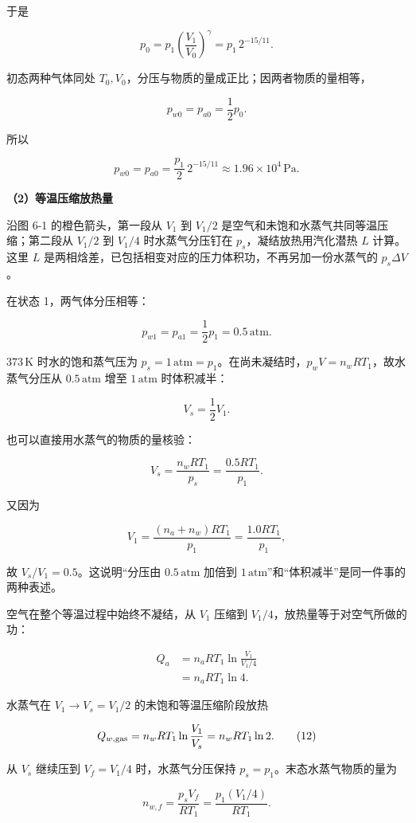 \documentclass[12pt,a4paper,UTF8]{ctexart}
\begin{document}
于是

\[p_0=p_1\left(\frac{V_1}{V_0}\right)^\gamma
=p_1\,2^{-15/11}. \tag{7}\]

初态两种气体同处 \(T_0,V_0\)，分压与物质的量成正比；因两者物质的量相等，

\[p_{w0}=p_{a0}=\frac12p_0.\]

所以

\[\boxed{
p_{w0}=p_{a0}
=\frac{p_1}{2}\,2^{-15/11}
\approx1.96\times10^4\,\mathrm{Pa}
}. \tag{8}\]

\textbf{（2）等温压缩放热量}

沿图 6-1 的橙色箭头，第一段从 \(V_1\) 到 \(V_1/2\)
是空气和未饱和水蒸气共同等温压缩；第二段从 \(V_1/2\) 到 \(V_1/4\)
时水蒸气分压钉在 \(p_s\)，凝结放热用汽化潜热 \(L\) 计算。这里 \(L\)
是两相焓差，已包括相变对应的压力体积功，不再另加一份水蒸气的
\(p_s\Delta V\)。

在状态 1，两气体分压相等：

\[p_{w1}=p_{a1}=\frac12p_1=0.5\,\mathrm{atm}. \tag{9}\]

\(373\,\mathrm K\) 时水的饱和蒸气压为
\(p_s=1\,\mathrm{atm}=p_1\)。在尚未凝结时，\(p_wV=n_wRT_1\)，故水蒸气分压从
\(0.5\,\mathrm{atm}\) 增至 \(1\,\mathrm{atm}\) 时体积减半：

\[V_s=\frac12V_1. \tag{10}\]

也可以直接用水蒸气的物质的量核验：

\[V_s=\frac{n_wRT_1}{p_s}
=\frac{0.5RT_1}{p_1}.\]

又因为

\[V_1=\frac{(n_a+n_w)RT_1}{p_1}
=\frac{1.0RT_1}{p_1},\]

故 \(V_s/V_1=0.5\)。这说明``分压由 \(0.5\,\mathrm{atm}\) 加倍到
\(1\,\mathrm{atm}\)''和``体积减半''是同一件事的两种表述。

空气在整个等温过程中始终不凝结，从 \(V_1\) 压缩到
\(V_1/4\)，放热量等于对空气所做的功：

\[\begin{aligned}
Q_a
&=n_aRT_1\ln\frac{V_1}{V_1/4}\\
&=n_aRT_1\ln4.
\end{aligned} \tag{11}\]

水蒸气在 \(V_1\to V_s=V_1/2\) 的未饱和等温压缩阶段放热

\[Q_{w,\rm gas}=n_wRT_1\ln\frac{V_1}{V_s}
=n_wRT_1\ln2. \tag{12}\]

从 \(V_s\) 继续压到 \(V_f=V_1/4\) 时，水蒸气分压保持
\(p_s=p_1\)。末态水蒸气物质的量为

\[n_{w,f}=\frac{p_sV_f}{RT_1}
=\frac{p_1(V_1/4)}{RT_1}.\]
\end{document}
